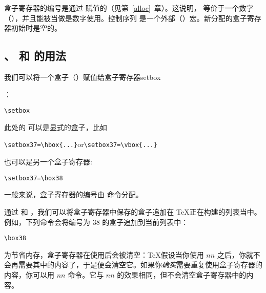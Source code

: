 \documentclass{book}
\begin{document}
盒子寄存器的编号是通过  赋值的（见第~\ref{alloc}~章）。这说明， 等价于一个数字（），并且能被当做是数字使用。控制序列  是一个外部（）宏。新分配的盒子寄存器初始时是空的。


\subsection{、 和  的用法}

我们可以将一个盒子（）赋值给盒子寄存器\cstoidx setbox\par ：
\begin{Disp}\verb>\setbox>\end{Disp}
此处的  可以是显式的盒子，比如
\begin{Disp}
\verb>\setbox37=\hbox{...}>\quad or\quad \verb>\setbox37=\vbox{...}>
\end{Disp}
也可以是另一个盒子寄存器:
\begin{verbatim}
\setbox37=\box38
\end{verbatim}
一般来说，盒子寄存器的编号由  命令分配。

通过  和 ，我们可以将盒子寄存器中保存的盒子追加在 \TeX 正在构建的列表当中。例如，下列命令会将编号为 38 的盒子追加到当前列表中：
\begin{verbatim}
\box38
\end{verbatim}
为节省内存，盒子寄存器在使用后会被清空：\TeX 假设当你使用 $nn$ 之后，你就不会再需要其中的内容了，于是便会清空它。如果你\emph{确实}需要重复使用盒子寄存器的内容，你可以用 $nn$ 命令。它与 $nn$ 的效果相同，但不会清空盒子寄存器中的内容。
\end{document}
